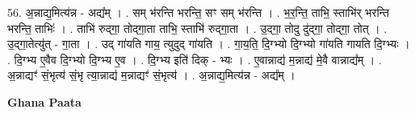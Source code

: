 \documentclass[17pt]{extarticle}
\begin{document}
56. अ॒न्नाद्य॒मित्य॑न्न - अद्य᳚म् । . सम् भ॑रन्ति भरन्ति॒ सꣳ सम् भ॑रन्ति । . भ॒र॒न्ति॒ ताभि॒ स्ताभि॑र् भरन्ति भरन्ति॒ ताभिः॑ । . ताभि॑ रुद्‍गा॒ तोद्‍गा॒ता ताभि॒ स्ताभि॑ रुद्‍गा॒ता । . उ॒द्‍गा॒ तोदु दु॑द्‍गा॒ तोद्‍गा॒ तोत् । . उ॒द्‍गा॒तेत्यु॑त् - गा॒ता । . उद् गा॑यति गाय॒ त्युदुद् गा॑यति । . गा॒य॒ति॒ दि॒ग्भ्यो दि॒ग्भ्यो गा॑यति गायति दि॒ग्भ्यः । . दि॒ग्भ्य ए॒वैव दि॒ग्भ्यो दि॒ग्भ्य ए॒व । . दि॒ग्भ्य इति॑ दिक् - भ्यः । . ए॒वान्नाद्य॑ म॒न्नाद्य॑ मे॒वै वान्नाद्य᳚म् । . अ॒न्नाद्यꣳ॑ सं॒भृत्य॑ सं॒भृ त्या॒न्नाद्य॑ म॒न्नाद्यꣳ॑ सं॒भृत्य॑ । . अ॒न्नाद्य॒मित्य॑न्न - अद्य᳚म् । \newline

\textbf{Ghana Paata } \newline
\end{document}
